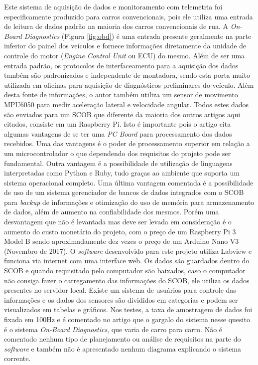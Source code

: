 Este sistema de aquisição de dados e monitoramento com telemetria foi especificamente produzido para carros convencionais, pois ele utiliza uma entrada de leitura de dados padrão na maioria dos carros convencionais de rua. A \textit{On-Board Diagnostics} (Figura \ref{fig:obd}) é uma entrada presente geralmente na parte inferior do painel dos veículos e fornece informações diretamente da unidade de controle do motor (\textit{Engine Control Unit} ou ECU) do mesmo. Além de ser uma entrada padrão, os protocolos de interfaceamento para a aquisição dos dados também são padronizados e independente de montadora, sendo esta porta muito utilizada em oficinas para aquisição de diagnósticos preliminares do veículo. Além desta fonte de informações, o autor também utiliza um sensor de movimento MPU6050 para medir aceleração lateral e velocidade angular. Todos estes dados são enviados para um SCOB que diferente da maioria dos outros artigos aqui citados, consiste em um Raspberry Pi. Isto é importante pois o artigo cita algumas vantagens de se ter uma \textit{PC Board} para processamento dos dados recebidos. Uma das vantagens é o poder de processamento superior em relação a um microcontrolador o que dependendo dos requisitos do projeto pode ser fundamental. Outra vantagem é a possibilidade de utilização de linguagens interpretadas como Python e Ruby, tudo graças ao ambiente que suporta um sistema operacional completo. Uma última vantagem comentada é a possibilidade de uso de um sistema gerenciador de bancos de dados integrados com o SCOB para \textit{backup} de informações e otimização do uso de memória para armazenamento de dados, além de aumento na confiabilidade dos mesmos. Porém uma desvantagem que não é levantada mas deve ser levada em consideração é o aumento do custo monetário do projeto, com o preço de um Raspberry Pi 3 Model B sendo aproximadamente dez vezes o preço de um Arduino Nano V3 (Novembro de 2017). O \textit{software} desenvolvido para este projeto utiliza Labview e funciona via internet com uma interface web. Os dados são guardados dentro do SCOB e quando requisitado pelo computador são baixados, caso o computador não consiga fazer o carregamento das informações do SCOB, ele utiliza os dados presentes no servidor local. Existe um sistema de usuários para controle das informações e os dados dos sensores são divididos em categorias e podem ser visualizados em tabelas e gráficos. Nos testes, a taxa de amostragem de dados foi fixada em 100Hz e é comentado no artigo que o gargalo do sistema nesse quesito é o sistema \textit{On-Board Diagnostics}, que varia de carro para carro. Não é comentado nenhum tipo de planejamento ou análise de requisitos na parte do \textit{software} e também não é apresentado nenhum diagrama explicando o sistema corrente.    

